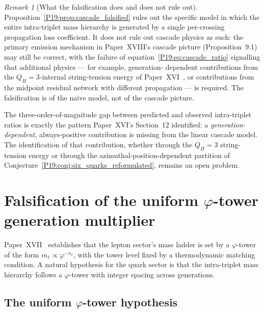 \documentclass[11pt,a4paper]{article}
\theoremstyle{definition}\newtheorem{definition}[theorem]{Definition}
\theoremstyle{remark}
\newtheorem{remark}[theorem]{Remark}
\newcommand{\vp}{\varphi}
\newcommand{\QH}{Q_H}
\begin{document}
\begin{remark}[What the falsification does and does not rule out]
\label{P19:rem:cascade_scope}
Proposition~\ref{P19:prop:cascade_falsified} rules out the specific
model in which the entire intra-triplet mass hierarchy is generated
by a single per-crossing propagation loss coefficient.  It does not
rule out cascade physics as such: the primary emission mechanism
in Paper~XVIII's cascade picture (Proposition~9.1) may still be %
correct, with the failure of equation~\eqref{P19:eq:cascade_ratio}
signalling that additional physics --- for example, generation-
dependent contributions from the $\QH=3$-internal string-tension
energy of Paper~XVI~\cite{Paper16}, or contributions from the
midpoint residual network with different propagation --- is
required.  The falsification is of the naive model, not of
the cascade picture.
\end{remark}

The three-order-of-magnitude gap between predicted and observed
intra-triplet ratios is exactly the pattern Paper~XVI's
Section~12 identified: a
\emph{generation-dependent}, always-positive contribution is
missing from the linear cascade model.  The identification of that
contribution, whether through the $\QH=3$ string-tension energy
or through the azimuthal-position-dependent partition of
Conjecture~\ref{P19:conj:six_quarks_reformulated}, remains an open
problem.

\section{Falsification of the uniform $\vp$-tower generation multiplier}
\label{P19:sec:phi_tower_falsification}

Paper~XVII~\cite{Paper17} establishes that the lepton sector's
mass ladder is set by a $\vp$-tower of the form $m_\ell\propto
\vp^{-n_\ell}$, with the tower level fixed by a thermodynamic
matching condition.  A natural hypothesis for the quark sector is
that the intra-triplet mass hierarchy follows a $\vp$-tower with
integer spacing across generations.

\subsection{The uniform $\vp$-tower hypothesis}
\end{document}
